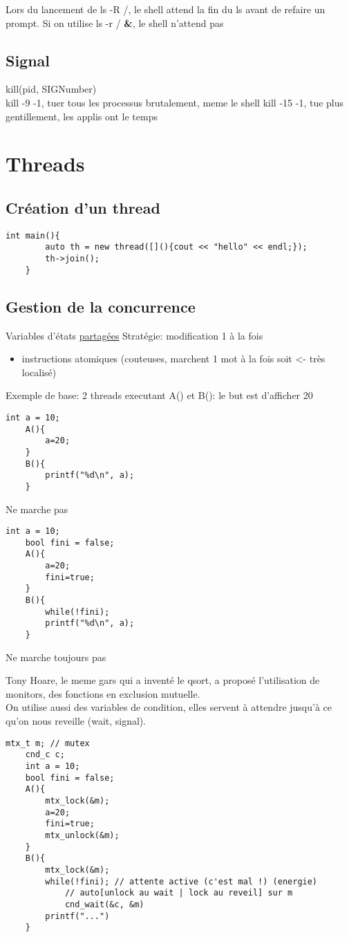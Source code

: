 \documentclass[11pt]{article}
\begin{document}
Lors du lancement de ls -R /, le shell attend la fin du ls avant de refaire un prompt.
Si on utilise ls -r / \textbf{\&}, le shell n'attend pas

\subsection{Signal}
kill(pid, SIGNumber)\\
kill -9 -1, tuer tous les processus brutalement, meme le shell
kill -15 -1, tue plus gentillement, les applis ont le temps

\pagebreak

\section{Threads}
\subsection{Création d'un thread}

\begin{lstlisting}[frame=single]
	int main(){
		auto th = new thread([](){cout << "hello" << endl;});
		th->join();
	}	
\end{lstlisting}

\subsection{Gestion de la concurrence}
Variables d'états \underline{partagées}
Stratégie: modification 1 à la fois
\begin{itemize}
	\item instructions atomiques (couteuses, marchent 1 mot à la fois soit <- très localisé)\\
\end{itemize}

Exemple de base: 2 threads executant A() et B(): le but est d'afficher 20
\begin{lstlisting}[frame=single]
	int a = 10;
	A(){
		a=20;
	}
	B(){
		printf("%d\n", a);
	}
\end{lstlisting}
Ne marche pas

\begin{lstlisting}[frame=single]
	int a = 10;
	bool fini = false;
	A(){
		a=20;
		fini=true;
	}
	B(){
		while(!fini);
		printf("%d\n", a);
	}
\end{lstlisting}
Ne marche toujours pas

\pagebreak


Tony Hoare, le meme gars qui a inventé le qsort, a proposé l'utilisation de monitors, des fonctions en exclusion mutuelle. \\
On utilise aussi des variables de condition, elles servent à attendre jusqu'à ce qu'on nous reveille (wait, signal).

\begin{lstlisting}[frame=single]
	mtx_t m; // mutex
	cnd_c c;
	int a = 10;
	bool fini = false;
	A(){
		mtx_lock(&m);
		a=20;
		fini=true;
		mtx_unlock(&m);
	}
	B(){
		mtx_lock(&m);
		while(!fini); // attente active (c'est mal !) (energie)
			// auto[unlock au wait | lock au reveil] sur m
			cnd_wait(&c, &m) 
		printf("...")
	}
\end{lstlisting}
\end{document}
